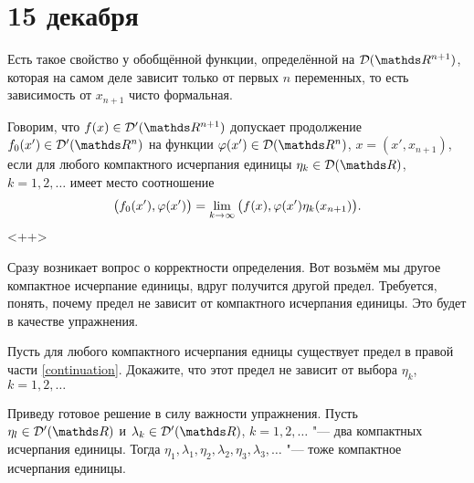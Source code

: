 \section{15 декабря}
Есть такое свойство у обобщённой функции, определённой на $\D(\R^{n+1})$, которая на самом деле зависит только от первых $n$ переменных, то есть зависимость от $x_{n+1}$ чисто формальная.

\begin{Def}
	Говорим, что $f(x)\in \D'(\R^{n+1})$ допускает продолжение $f_0(x')\in\D'(\R^n)$ на функции $\phi(x')\in \D(\R^n)$, $x = (x',x_{n+1})$, если для любого компактного исчерпания единицы $\eta_k\in\D(\R)$, $k=1,2,\dots$ имеет место соотношение
	\begin{equation}
	  \big(f_0(x'),\varphi(x')\big) = \lim\limits_{k\rightarrow\infty}\big(f(x),\varphi(x')\eta_k(x_{n+1})\big).
		\label{continuation}
	\end{equation}<++>
\end{Def}
Сразу возникает вопрос о корректности определения. Вот возьмём мы другое компактное исчерпание единицы, вдруг получится другой предел. Требуется, понять, почему предел не зависит от компактного исчерпания единицы. Это будет в качестве упражнения.
\begin{Task}
	Пусть для любого компактного исчерпания едницы существует предел в правой части \eqref{continuation}. Докажите, что этот предел не зависит от выбора $\eta_k$, $k=1,2,\dots$
\end{Task}

Приведу готовое решение в силу важности упражнения. Пусть $\eta_l\in\D'(\R)$ и $\lambda_k\in\D'(\R)$, $k=1,2,\dots$ "--- два компактных исчерпания единицы. Тогда $\eta_1,\lambda_1,\eta_2,\lambda_2,\eta_3,\lambda_3,\dots$ "--- тоже компактное исчерпания единицы.

